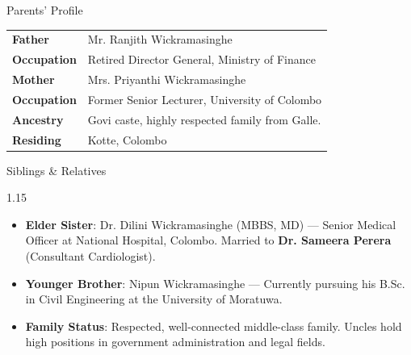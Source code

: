\documentclass[11pt,a4paper]{article}
\begin{document}
\vspace{0.2cm}

\begin{minipage}[t]{0.485\textwidth}
  \begin{biodatabox}{Parents' Profile}
    \renewcommand{\arraystretch}{1.2}
    \begin{tabularx}{\linewidth}{@{}l X@{}}
      \textbf{Father} & Mr. Ranjith Wickramasinghe \\
      \textbf{Occupation} & Retired Director General, Ministry of Finance \\
      \textbf{Mother} & Mrs. Priyanthi Wickramasinghe \\
      \textbf{Occupation} & Former Senior Lecturer, University of Colombo \\
      \textbf{Ancestry} & Govi caste, highly respected family from Galle. \\
      \textbf{Residing} & Kotte, Colombo \\
    \end{tabularx}
  \end{biodatabox}
\end{minipage}\hfill
\begin{minipage}[t]{0.485\textwidth}
  \begin{biodatabox}{Siblings \& Relatives}
    \begin{spacing}{1.15}
      \begin{itemize}[leftmargin=12pt, topsep=1pt, itemsep=4pt, parsep=0pt]
        \item \textbf{Elder Sister}: Dr. Dilini Wickramasinghe (MBBS, MD) --- Senior Medical Officer at National Hospital, Colombo. Married to \textbf{Dr. Sameera Perera} (Consultant Cardiologist).
        \item \textbf{Younger Brother}: Nipun Wickramasinghe --- Currently pursuing his B.Sc. in Civil Engineering at the University of Moratuwa.
        \item \textbf{Family Status}: Respected, well-connected middle-class family. Uncles hold high positions in government administration and legal fields.
      \end{itemize}
    \end{spacing}
  \end{biodatabox}
\end{minipage}
\par

\vspace{0.2cm}
\end{document}
